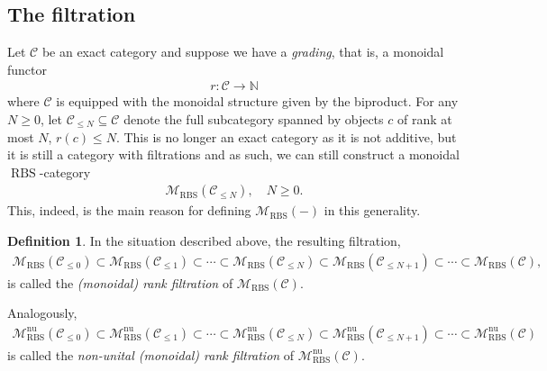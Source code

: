 \documentclass[12pt, reqno]{amsart}
\theoremstyle{plain}
\theoremstyle{definition}
\newtheorem{definition}[theorem]{Definition}
\newcommand{\N}{\mathbb N}
\begin{document}
\subsection{The filtration}\label{filtration}

Let $\mathcal{C}$ be an exact category and suppose we have a \textit{grading}, that is, a monoidal functor
\begin{align*}
r\colon \mathcal{C}\rightarrow \N
\end{align*}
where $\mathcal{C}$ is equipped with the monoidal structure given by the biproduct. For any $N\geq 0$, let $\mathcal{C}_{\leq N}\subseteq \mathcal{C}$ denote the full subcategory spanned by objects $c$ of rank at most $N$, $r(c)\leq N$. This is no longer an exact category as it is not additive, but it is still a category with filtrations and as such, we can still construct a monoidal $\operatorname{RBS}$-category
\begin{align*}
\mathscr{M}_{\operatorname{RBS}}(\mathcal{C}_{\leq N}), \quad N\geq 0.
\end{align*}
This, indeed, is the main reason for defining $\mathscr{M}_{\operatorname{RBS}}(-)$ in this generality.

\begin{definition}
In the situation described above, the resulting filtration,
\begin{align*}
\mathscr{M}_{\operatorname{RBS}}(\mathcal{C}_{\leq 0})\subset \mathscr{M}_{\operatorname{RBS}}(\mathcal{C}_{\leq 1}) \subset\cdots \subset \mathscr{M}_{\operatorname{RBS}}(\mathcal{C}_{\leq N})\subset \mathscr{M}_{\operatorname{RBS}}(\mathcal{C}_{\leq N+1}) \subset \cdots
 \subset \mathscr{M}_{\operatorname{RBS}}(\mathcal{C}),
\end{align*}
is called the \textit{(monoidal) rank filtration} of $\mathscr{M}_{\operatorname{RBS}}(\mathcal{C})$.

Analogously,
\begin{align*}
\mathscr{M}_{\operatorname{RBS}}^{\operatorname{nu}}(\mathcal{C}_{\leq 0})\subset \mathscr{M}_{\operatorname{RBS}}^{\operatorname{nu}}(\mathcal{C}_{\leq 1}) \subset\cdots \subset \mathscr{M}_{\operatorname{RBS}}^{\operatorname{nu}}(\mathcal{C}_{\leq N})\subset \mathscr{M}_{\operatorname{RBS}}^{\operatorname{nu}}(\mathcal{C}_{\leq N+1}) \subset \cdots
 \subset \mathscr{M}_{\operatorname{RBS}}^{\operatorname{nu}}(\mathcal{C})
\end{align*}
is called the \textit{non-unital (monoidal) rank filtration} of $\mathscr{M}_{\operatorname{RBS}}^{\operatorname{nu}}(\mathcal{C})$.
\end{definition}
\end{document}
